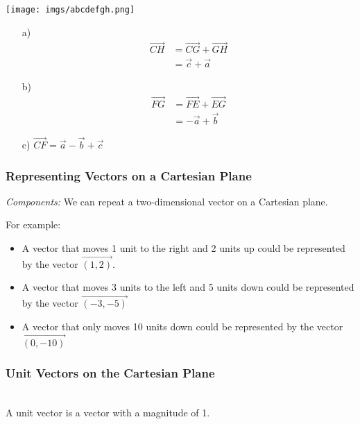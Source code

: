 \documentclass{article}
\begin{document}
\begin{minipage}{0.45\textwidth}
    \centering
        \texttt{[image: imgs/abcdefgh.png]}
\end{minipage}%
\begin{minipage}{0.5\textwidth}
    \begin{enumerate}
        \item[a)] 
        \begin{align*}    
            \overrightarrow{CH} &= \overrightarrow{CG} + \overrightarrow{GH} \\
                                &= \vec{c} + \vec{a}
        \end{align*}
        \item[b)] 
        \begin{align*}
            \overrightarrow{FG} &= \overrightarrow{FE} + \overrightarrow{EG} \\
                                &= -\vec{a} + \vec{b}
        \end{align*}
        \item[c)] $\overrightarrow{CF} = \vec{a} - \vec{b} + \vec{c}$ 
    \end{enumerate}
\end{minipage}

\subsubsection{Representing Vectors on a Cartesian Plane}
\textit{Components: }
We can repeat a two-dimensional vector on a Cartesian plane.

For example:
\begin{itemize}
    \item A vector that moves 1 unit to the right and 2 units up could be represented by the vector $\overrightarrow{(1,2)}$.
    \item A vector that moves 3 units to the left and 5 units down could be represented by the vector $\overrightarrow{(-3,-5)}$
    \item A vector that only moves 10 units down could be represented by the vector $\overrightarrow{(0,-10)}$
\end{itemize}
\subsubsection{Unit Vectors on the Cartesian Plane}\\


A unit vector is a vector with a magnitude of 1.\\
\end{document}
